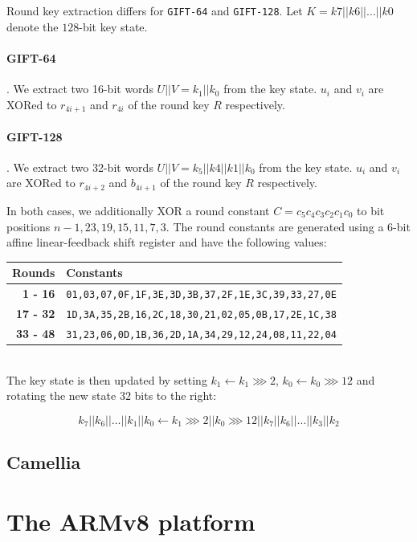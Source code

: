 \documentclass[12pt]{report}
\begin{document}
Round key extraction differs for \texttt{GIFT-64} and \texttt{GIFT-128}. Let
$K=k7||k6||\dots||k0$ denote the $128$-bit key state.

\paragraph{GIFT-64}. We extract two 16-bit words $U||V=k_1||k_0$ from the key
state. $u_i$ and $v_i$ are XORed to $r_{4i+1}$ and $r_{4i}$ of the round key
$R$ respectively.

\paragraph{GIFT-128}. We extract two 32-bit words $U||V=k_5||k4||k1||k_0$ from
the key state. $u_i$ and $v_i$ are XORed to $r_{4i+2}$ and $b_{4i+1}$ of the
round key $R$ respectively.

In both cases, we additionally XOR a round constant $C=c_5c_4c_3c_2c_1c_0$ to
bit positions $n-1,23,19,15,11,7,3$. The round constants are generated using a
6-bit affine linear-feedback shift register and have the following values:\\

\begin{tabular}{r|l}
    \textbf{Rounds} & \textbf{Constants} \\
    \hline
    \textbf{1 - 16} &  \small\texttt{01,03,07,0F,1F,3E,3D,3B,37,2F,1E,3C,39,33,27,0E} \\
    \textbf{17 - 32} & \small\texttt{1D,3A,35,2B,16,2C,18,30,21,02,05,0B,17,2E,1C,38} \\
    \textbf{33 - 48} & \small\texttt{31,23,06,0D,1B,36,2D,1A,34,29,12,24,08,11,22,04}
\end{tabular}\\

The key state is then updated by setting $k_1\leftarrow k_1\ggg 2$,
$k_0\leftarrow k_0\ggg 12$ and rotating the new state $32$ bits to the right:

\[
    k_7||k_6||\dots||k_1||k_0\leftarrow k_1\ggg 2||k_0\ggg 12||k_7||k_6||\dots||k_3||k_2
\]

\subsection{Camellia}

\section{The ARMv8 platform}
\end{document}
